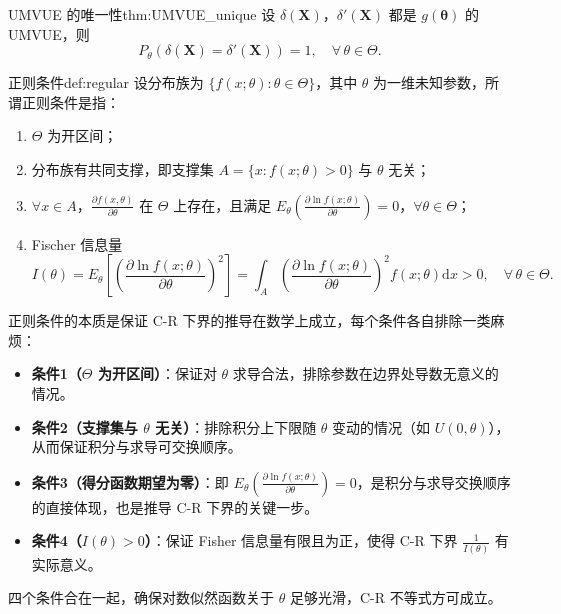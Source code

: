 \begin{theorem}{UMVUE 的唯一性}{thm:UMVUE_unique}
设 $\delta(\boldsymbol{X})$，$\delta'(\boldsymbol{X})$ 都是 $g(\boldsymbol{\theta})$ 的 UMVUE，则
\[
P_{\theta}(\delta(\boldsymbol{X}) = \delta'(\boldsymbol{X})) = 1, \quad \forall\, \theta \in \Theta.
\]
\end{theorem}
\begin{definition}{正则条件}{def:regular}
设分布族为 $\{f(x;\theta): \theta \in \Theta\}$，其中 $\theta$ 为一维未知参数，所谓正则条件是指：
\begin{enumerate}
    \item $\Theta$ 为开区间；
    \item 分布族有共同支撑，即支撑集 $A = \{x: f(x;\theta) > 0\}$ 与 $\theta$ 无关；
    \item $\forall x \in A$，$\frac{\partial f(x,\theta)}{\partial \theta}$ 在 $\Theta$ 上存在，且满足
    $E_{\theta}\!\left(\frac{\partial \ln f(x;\theta)}{\partial \theta}\right) = 0$，$\forall \theta \in \Theta$；
    \item Fischer 信息量
    \[
    I(\theta) = E_{\theta}\left[\left(\frac{\partial \ln f(x;\theta)}{\partial \theta}\right)^2\right]
    = \int_A \left(\frac{\partial \ln f(x;\theta)}{\partial \theta}\right)^2 f(x;\theta)\mathrm{d}x > 0, \quad \forall\, \theta \in \Theta.
    \]
\end{enumerate}
\end{definition}
\begin{note}
正则条件的本质是保证 C-R 下界的推导在数学上成立，每个条件各自排除一类麻烦：
\begin{itemize}
  \item \textbf{条件1（$\Theta$ 为开区间）}：保证对 $\theta$ 求导合法，排除参数在边界处导数无意义的情况。
  \item \textbf{条件2（支撑集与 $\theta$ 无关）}：排除积分上下限随 $\theta$ 变动的情况（如 $U(0,\theta)$），从而保证积分与求导可交换顺序。
  \item \textbf{条件3（得分函数期望为零）}：即 $E_\theta\!\left(\frac{\partial \ln f(x;\theta)}{\partial \theta}\right) = 0$，是积分与求导交换顺序的直接体现，也是推导 C-R 下界的关键一步。
  \item \textbf{条件4（$I(\theta) > 0$）}：保证 Fisher 信息量有限且为正，使得 C-R 下界 $\frac{1}{I(\theta)}$ 有实际意义。
\end{itemize}
四个条件合在一起，确保对数似然函数关于 $\theta$ 足够光滑，C-R 不等式方可成立。
\end{note}
